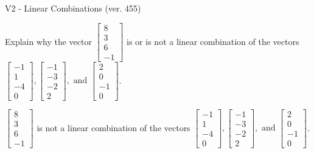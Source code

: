 \begin{exercise}
  \begin{exerciseTitle}V2 - Linear Combinations (ver. 455)\end{exerciseTitle}
  \begin{exerciseStatement}
    Explain why the vector \(\left[\begin{array}{c}
8 \\
3 \\
6 \\
-1
\end{array}\right]\)  is or is not a linear 
	combination of the vectors \(\left[\begin{array}{c}
-1 \\
1 \\
-4 \\
0
\end{array}\right] , \left[\begin{array}{c}
-1 \\
-3 \\
-2 \\
2
\end{array}\right] , \text{ and } \left[\begin{array}{c}
2 \\
0 \\
-1 \\
0
\end{array}\right]\).
	


  \end{exerciseStatement}
  \begin{exerciseAnswer}
   \(\left[\begin{array}{c}
8 \\
3 \\
6 \\
-1
\end{array}\right]\) 
  	 is not  
	a linear combination of the vectors \(\left[\begin{array}{c}
-1 \\
1 \\
-4 \\
0
\end{array}\right] , \left[\begin{array}{c}
-1 \\
-3 \\
-2 \\
2
\end{array}\right] , \text{ and } \left[\begin{array}{c}
2 \\
0 \\
-1 \\
0
\end{array}\right]\).

	
  


  \end{exerciseAnswer}
\end{exercise}
